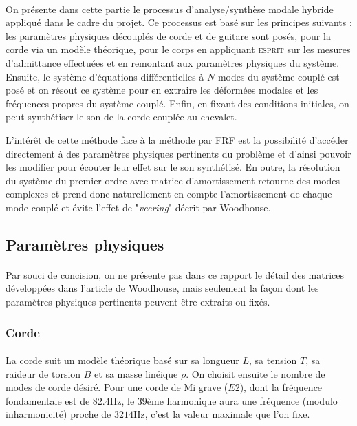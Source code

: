 \paragraph{}
  On présente dans cette partie le processus d'analyse/synthèse modale hybride
appliqué dans le cadre du projet. Ce processus est basé sur les principes
suivants : les paramètres physiques découplés de corde et de guitare sont
posés, pour la corde via un modèle théorique, pour le corps en appliquant
\textsc{esprit} sur les mesures d'admittance effectuées et en remontant aux
paramètres physiques du système.
  Ensuite, le système d'équations différentielles à \( N \) modes du système
couplé est posé et on résout ce système pour en extraire les déformées modales
et les fréquences propres du système couplé. Enfin, en fixant des
conditions initiales, on peut synthétiser le son de la corde couplée au
chevalet.

  L'intérêt de cette méthode face à la méthode par FRF est la possibilité
d'accéder directement à des paramètres physiques pertinents du problème et
d'ainsi pouvoir les modifier pour écouter leur effet sur le son synthétisé.
  En outre, la résolution du système du premier ordre avec matrice
d'amortissement retourne des modes complexes et prend donc naturellement en
compte l'amortissement de chaque mode couplé et évite l'effet de
"\emph{veering}" décrit par Woodhouse.

\subsection{Paramètres physiques}

\paragraph{}
  Par souci de concision, on ne présente pas dans ce rapport le détail des
matrices développées dans l'article de Woodhouse, mais seulement la façon dont
les paramètres physiques pertinents peuvent être extraits ou fixés.

\subsubsection{Corde}
  \paragraph{}
  
  La corde suit un modèle théorique basé sur sa longueur \( L \), sa tension
\( T \), sa raideur de torsion \( B \) et sa masse linéique \( \rho{} \).
  On choisit ensuite le nombre de modes de corde désiré.
  Pour une corde de Mi grave (\( E2 \)), dont la fréquence fondamentale est
de \( \si{82.4 \hertz}\), le \( 39 \)ème harmonique aura une fréquence (modulo 
inharmonicité) proche de \( \si{3214\hertz} \), c'est la valeur maximale que
l'on fixe.

